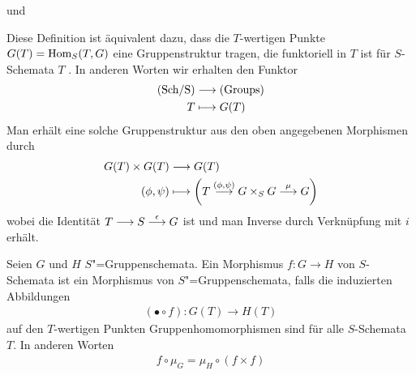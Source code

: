 \documentclass[german]{scrreprt}
\begin{document}
\begin{Definition}[$S$"=Gruppenschema]
\begin{description}[labelwidth=4cm]
    und
  \item[Assoziativität]
  \end{description}
  \begin{Bemerkung}
    Diese Definition ist äquivalent dazu, dass die $T$-wertigen Punkte
    $G(T)=\operatorname{Hom}_S(T,G)$ eine Gruppenstruktur tragen, die funktoriell in
    $T$ ist für $S$-Schemata $T$ \cite[Chapter (4.15)]{wedhorn}. 
    In anderen Worten wir erhalten den Funktor 
    \begin{align*}
      \text{(Sch/S)} &\longrightarrow \text{(Groups)}\\
      T &\longmapsto G(T)
    \end{align*}
    Man erhält eine solche Gruppenstruktur aus den oben angegebenen
    Morphismen durch
    \begin{align*}
      G(T)\times G(T) &\longrightarrow G(T)\\
      (\phi, \psi) &\longmapsto 
                     \left(
                     T\overset{(\phi,\psi)}{\longrightarrow} G\times_S G
                     \overset\mu{\longrightarrow} G
                     \right)
    \end{align*}
    wobei die Identität $T\longrightarrow S\overset{\epsilon}{\longrightarrow} G$ ist und
    man Inverse durch Verknüpfung mit $i$ erhält.
    \cite[Proposition IV.3.2]{silverman2}
  \end{Bemerkung}

  \begin{Definition}
    Seien $G$ und $H$ $S$"=Gruppenschemata.
    Ein Morphismus $f\colon G\to H$ von $S$-Schemata ist ein Morphismus
    von $S$"=Gruppenschemata, falls die induzierten Abbildungen
    \begin{gather*}
      (\bullet\circ f)\colon G(T)\to H(T)
    \end{gather*}auf den $T$-wertigen Punkten
    Gruppenhomomorphismen sind für alle $S$-Schemata $T$.
    In anderen Worten
    \begin{gather*}
      f\circ\mu_G = \mu_H\circ(f\times f)
    \end{gather*}
    \cite[Definition 4.42]{wedhorn}
  \end{Definition}


\end{Definition}
\end{document}
